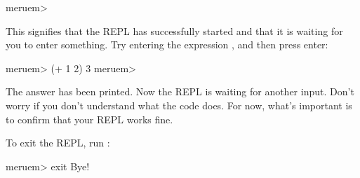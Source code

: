 \begin{REPL}
meruem>
\end{REPL}

This signifies that the REPL has successfully started and that it is waiting for you to enter something. Try entering the expression , and then press enter:

\begin{REPL}
meruem> (+ 1 2)
3
meruem>
\end{REPL}

The answer  has been printed. Now the REPL is waiting for another input. Don't worry if you don't understand what the code  does. For now, what's important is to confirm that your REPL works fine.

To exit the REPL, run :

\begin{REPL}
meruem> exit
Bye!
\end{REPL}